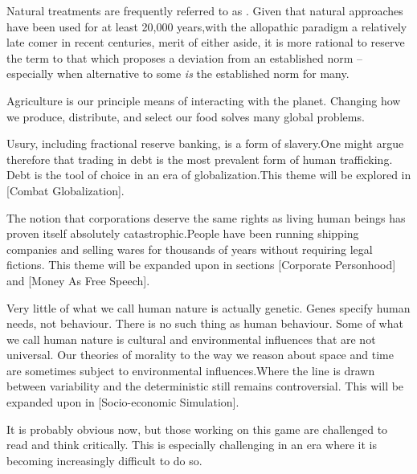 Natural treatments are frequently referred to as . Given that natural approaches have been used for at least 20,000 years,\footnotecite[hardy2012] with the allopathic paradigm a relatively late comer in recent centuries, merit of either aside, it is more rational to reserve the term  to that which proposes a deviation from an established norm -- especially when alternative to some {\it is} the established norm for many.


Agriculture is our principle means of interacting with the planet. Changing how we produce, distribute, and select our food solves many global problems.\footnotecite[foodwaste]


Usury, including fractional reserve banking, is a form of slavery. One might argue therefore that trading in debt is the most prevalent form of human trafficking. Debt is the tool of choice in an era of globalization.\footnotecite[perkins2005] This theme will be explored in [Combat Globalization].


The notion that corporations deserve the same rights as living human beings has proven itself absolutely catastrophic. People have been running shipping companies and selling wares for thousands of years without requiring legal fictions. This theme will be expanded upon in sections \in{}[Corporate Personhood] and \in{}[Money As Free Speech].


Very little of what we call human nature is actually genetic. Genes specify human needs, not behaviour. There is no such thing as  human behaviour. Some of what we call human nature is cultural and environmental influences that are not universal. Our theories of morality to the way we reason about space and time are sometimes subject to environmental influences.\footnotecite[henrich2010] Where the line is drawn between variability and the deterministic still remains controversial. This will be expanded upon in [Socio-economic Simulation]. 
\stopitemize

It is probably obvious now, but those working on this game are challenged to read and think critically. This is especially challenging in an era where it is becoming increasingly difficult to do so.

\StopChapter

